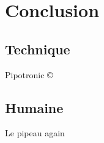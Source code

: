 \chapter*{Conclusion}
\section*{Technique}
Pipotronic \copyright \newline
\section*{Humaine}
Le pipeau again

